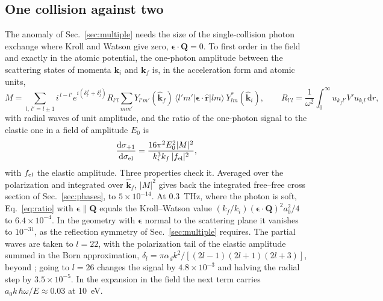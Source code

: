 \documentclass[11pt]{article}
\numberwithin{equation}{section}
\newcommand{\dd}{\mathrm d}
\begin{document}
\subsection{One collision against two}
\label{sec:onetwo}
The anomaly of Sec.~\ref{sec:multiple} needs the size of the single-collision photon exchange where Kroll and Watson
give zero, $\boldsymbol\epsilon\cdot\mathbf Q=0$. To first order in the field and exactly in the
atomic potential, the one-photon amplitude between the scattering states of momenta $\mathbf k_i$
and $\mathbf k_f$ is, in the acceleration form and atomic units,
\begin{equation}
M=\sum_{l,\,l'=l\pm1}i^{\,l-l'}e^{i(\delta^f_{l'}+\delta^i_l)}R_{l'l}
\sum_{mm'}Y_{l'm'}(\hat{\mathbf k}_f)\,\langle l'm'|\boldsymbol\epsilon\cdot\hat{\mathbf r}|lm\rangle\,Y^*_{lm}(\hat{\mathbf k}_i),\qquad
R_{l'l}=\frac{1}{\omega^2}\int_0^\infty u_{k_fl'}V'u_{k_il}\,\dd r,
\label{eq:Mamp}
\end{equation}
with radial waves of unit amplitude, and the ratio of the one-photon signal to the elastic one in
a field of amplitude $E_0$ is
\begin{equation}
\frac{\dd\sigma_{+1}}{\dd\sigma_{\rm el}}=\frac{16\pi^2E_0^2|M|^2}{k_i^3k_f\,|f_{\rm el}|^2},
\label{eq:ratio}
\end{equation}
with $f_{\rm el}$ the elastic amplitude. Three properties check it. Averaged over the polarization
and integrated over $\hat{\mathbf k}_f$, $|M|^2$ gives back the integrated free--free cross section
of Sec.~\ref{sec:phases}, to $5\times10^{-14}$. At 0.3~THz, where the photon is soft, Eq.~\eqref{eq:ratio} with
$\boldsymbol\epsilon\parallel\mathbf Q$ equals the Kroll--Watson value $(k_f/k_i)(\boldsymbol\epsilon\cdot\mathbf Q)^2a_0^2/4$
to $6.4\times10^{-4}$. In the geometry with $\boldsymbol\epsilon$ normal to the scattering plane it
vanishes to $10^{-31}$, as the reflection symmetry of Sec.~\ref{sec:multiple} requires. The partial waves are taken to
$l=22$, with the polarization tail of the elastic amplitude summed in the Born approximation,
$\delta_l=\pi\alpha_dk^2/[(2l-1)(2l+1)(2l+3)]$, beyond \cite{OMalley1961}; going to $l=26$ changes the
signal by $4.8\times10^{-3}$ and halving the radial step by $3.5\times10^{-5}$. In the expansion in the
field the next term carries $a_0k\,\hbar\omega/E\approx0.03$ at 10~eV.
\end{document}
